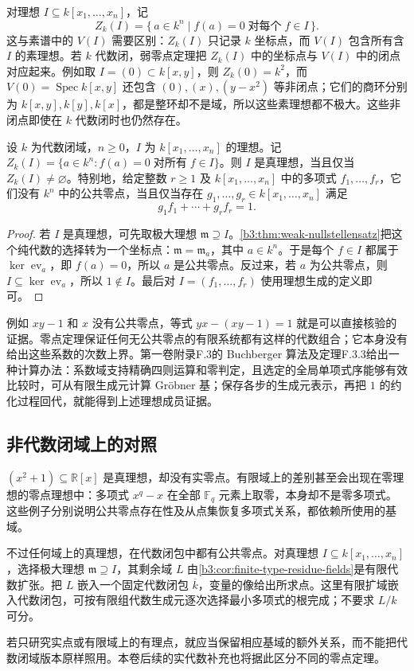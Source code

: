 对理想 \(I\subseteq k[x_1,\ldots,x_n]\)，记
\[
	Z_k(I)=\bigl\{\,a\in k^n\mid f(a)=0\;\text{对每个}\;f\in I\,\bigr\}.
\]
这与素谱中的 \(V(I)\) 需要区别：\(Z_k(I)\) 只记录 \(k\) 坐标点，而 \(V(I)\) 包含所有含 \(I\) 的素理想。若 \(k\) 代数闭，弱零点定理把 \(Z_k(I)\) 中的坐标点与 \(V(I)\) 中的闭点对应起来。例如取 \(I=(0)\subset k[x,y]\)，则 \(Z_k(0)=k^2\)，而 \(V(0)=\operatorname{Spec}k[x,y]\) 还包含 \((0),(x),(y-x^2)\) 等非闭点；它们的商环分别为 \(k[x,y],k[y],k[x]\)，都是整环却不是域，所以这些素理想都不极大。这些非闭点即使在 \(k\) 代数闭时也仍然存在。

\begin{corollary}\label{b3:cor:proper-ideal-common-zero}
	设 \(k\) 为代数闭域，\(n\ge0\)，\(I\) 为 \(k[x_1,\ldots,x_n]\) 的理想。记 \(Z_k(I)=\{a\in k^n:f(a)=0\;\text{对所有}\;f\in I\}\)。则 \(I\) 是真理想，当且仅当 \(Z_k(I)\ne\varnothing\)。特别地，给定整数 \(r\ge1\) 及 \(k[x_1,\ldots,x_n]\) 中的多项式 \(f_1,\ldots,f_r\)，它们没有 \(k^n\) 中的公共零点，当且仅当存在 \(g_1,\ldots,g_r\in k[x_1,\ldots,x_n]\) 满足
	\[
		g_1f_1+\cdots+g_rf_r=1.
	\]
\end{corollary}
\begin{proof}
	若 \(I\) 是真理想，可先取极大理想 \(\mathfrak m\supseteq I\)。\cref{b3:thm:weak-nullstellensatz}把这个纯代数的选择转为一个坐标点：\(\mathfrak m=\mathfrak m_a\)，其中 \(a\in k^n\)。于是每个 \(f\in I\) 都属于 \(\ker\operatorname{ev}_a\)，即 \(f(a)=0\)，所以 \(a\) 是公共零点。反过来，若 \(a\) 为公共零点，则 \(I\subseteq\ker\operatorname{ev}_a\)，所以 \(1\notin I\)。最后对 \(I=(f_1,\ldots,f_r)\) 使用理想生成的定义即可。
\end{proof}

例如 \(xy-1\) 和 \(x\) 没有公共零点，等式 \(yx-(xy-1)=1\) 就是可以直接核验的证据。零点定理保证任何无公共零点的有限系统都有这样的代数组合；它本身没有给出这些系数的次数上界。第一卷附录F.3的 Buchberger 算法及定理F.3.3给出一种计算办法：系数域支持精确四则运算和零判定，且选定的全局单项式序能够有效比较时，可从有限生成元计算 Gröbner 基；保存各步的生成元表示，再把 \(1\) 的约化过程回代，就能得到上述理想成员证据。

\subsection{非代数闭域上的对照}\label{b3:subsec:0602:03}

\((x^2+1)\subseteq\mathbb R[x]\) 是真理想，却没有实零点。有限域上的差别甚至会出现在零理想的零点理想中：多项式 \(x^q-x\) 在全部 \(\mathbb F_q\) 元素上取零，本身却不是零多项式。这些例子分别说明公共零点存在性及从点集恢复多项式关系，都依赖所使用的基域。

\ProseParagraphBreak
不过任何域上的真理想，在代数闭包中都有公共零点。对真理想 \(I\subseteq k[x_1,\ldots,x_n]\)，选择极大理想 \(\mathfrak m\supseteq I\)，其剩余域 \(L\) 由\cref{b3:cor:finite-type-residue-fields}是有限代数扩张。把 \(L\) 嵌入一个固定代数闭包 \(\overline k\)，变量的像给出所求点。这里有限扩域嵌入代数闭包，可按有限组代数生成元逐次选择最小多项式的根完成；不要求 \(L/k\) 可分。

\ProseParagraphBreak
若只研究实点或有限域上的有理点，就应当保留相应基域的额外关系，而不能把代数闭域版本原样照用。本卷后续的实代数补充也将据此区分不同的零点定理。
